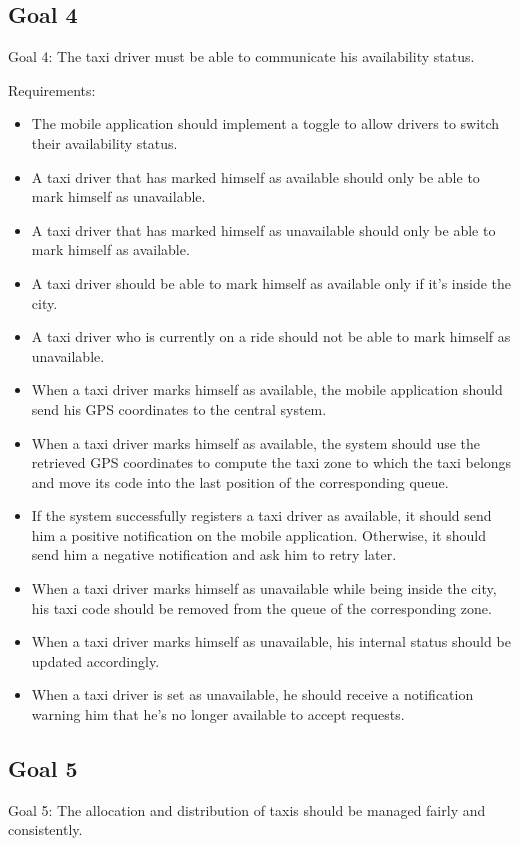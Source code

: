 \subsection{Goal 4}
Goal 4: The taxi driver must be able to communicate his availability status.

Requirements:
\begin{itemize}
\item The mobile application should implement a toggle to allow drivers to switch their availability status.
\item A taxi driver that has marked himself as available should only be able to mark himself as unavailable. 
\item A taxi driver that has marked himself as unavailable should only be able to mark himself as available. 
\item A taxi driver should be able to mark himself as available only if it’s inside the city. 
\item A taxi driver who is currently on a ride should not be able to mark himself as unavailable. 
\item When a taxi driver marks himself as available, the mobile application should send his GPS coordinates to the central system.
\item When a taxi driver marks himself as available, the system should use the retrieved GPS coordinates to compute the taxi zone to which the taxi belongs and move its code into the last position of the corresponding queue. 
\item If the system successfully registers a taxi driver as available, it should send him a positive notification on the mobile application. Otherwise, it should send him a negative notification and ask him to retry later.
\item When a taxi driver marks himself as unavailable while being inside the city, his taxi code should be removed from the queue of the corresponding zone.
\item When a taxi driver marks himself as unavailable, his internal status should be updated accordingly. 
\item When a taxi driver is set as unavailable, he should receive a notification warning him that he’s no longer available to accept requests.
\end{itemize}

\subsection{Goal 5}
Goal 5: The allocation and distribution of taxis should be managed fairly and consistently.

